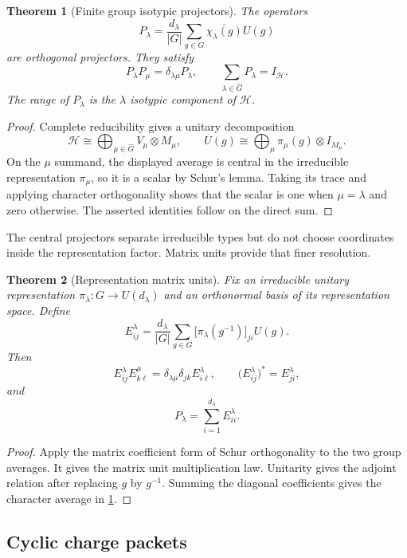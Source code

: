 \documentclass{aomart}
\newtheorem{theorem}{Theorem}[section]
\theoremstyle{definition}
\theoremstyle{remark}
\newcommand{\Hcal}{\mathcal H}
\newcommand{\abs}[1]{\left\lvert#1\right\rvert}
\begin{document}
\begin{theorem}[Finite group isotypic projectors]\label{thm:isotypic_projectors}
The operators
\[
P_\lambda
=
\frac{d_\lambda}{\abs{G}}
\sum_{g\in G}
\overline{\chi_\lambda(g)}U(g)
\]
are orthogonal projectors. They satisfy
\[
P_\lambda P_\mu=\delta_{\lambda\mu}P_\lambda,
\qquad
\sum_{\lambda\in\widehat G}P_\lambda=I_{\Hcal}.
\]
The range of \(P_\lambda\) is the \(\lambda\) isotypic component of \(\Hcal\).
\end{theorem}

\begin{proof}
Complete reducibility gives a unitary decomposition
\[
\Hcal
\cong
\bigoplus_{\mu\in\widehat G}
V_\mu\otimes M_\mu,
\qquad
U(g)
\cong
\bigoplus_\mu
\pi_\mu(g)\otimes I_{M_\mu}.
\]
On the \(\mu\) summand, the displayed average is central in the irreducible representation \(\pi_\mu\), so it is a scalar by Schur's lemma. Taking its trace and applying character orthogonality shows that the scalar is one when \(\mu=\lambda\) and zero otherwise. The asserted identities follow on the direct sum.
\end{proof}

The central projectors separate irreducible types but do not choose coordinates inside the representation factor. Matrix units provide that finer resolution.

\begin{theorem}[Representation matrix units]\label{thm:representation_matrix_units}
Fix an irreducible unitary representation \(\pi_\lambda:G\to U(d_\lambda)\) and an orthonormal basis of its representation space. Define
\[
E_{ij}^{\lambda}
=
\frac{d_\lambda}{\abs{G}}
\sum_{g\in G}
\bigl[\pi_\lambda(g^{-1})\bigr]_{ji}U(g).
\]
Then
\[
E_{ij}^{\lambda}E_{k\ell}^{\mu}
=
\delta_{\lambda\mu}\delta_{jk}E_{i\ell}^{\lambda},
\qquad
\bigl(E_{ij}^{\lambda}\bigr)^*=E_{ji}^{\lambda},
\]
and
\[
P_\lambda=\sum_{i=1}^{d_\lambda}E_{ii}^{\lambda}.
\]
\end{theorem}

\begin{proof}
Apply the matrix coefficient form of Schur orthogonality to the two group averages. It gives the matrix unit multiplication law. Unitarity gives the adjoint relation after replacing \(g\) by \(g^{-1}\). Summing the diagonal coefficients gives the character average in \cref{thm:isotypic_projectors}.
\end{proof}

\subsection{Cyclic charge packets}\label{subsec:cyclic_charge}
\end{document}
